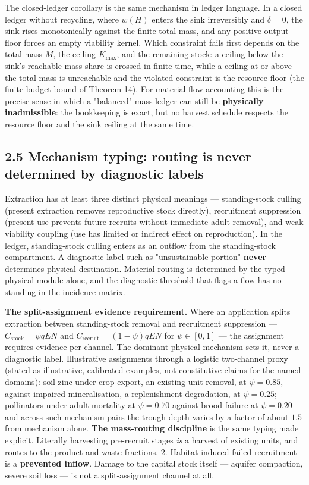 \documentclass[11pt]{article}
\begin{document}
The closed-ledger corollary is the same mechanism in ledger language. In a closed ledger without recycling, where \(w(H)\) enters the sink irreversibly and \(\delta = 0\), the sink rises monotonically against the finite total mass, and any positive output floor forces an empty viability kernel. Which constraint fails first depends on the total mass \(M\), the ceiling \(K_{\max}\), and the remaining stock: a ceiling below the sink's reachable mass share is crossed in finite time, while a ceiling at or above the total mass is unreachable and the violated constraint is the resource floor (the finite-budget bound of Theorem 14). For material-flow accounting this is the precise sense in which a "balanced" mass ledger can still be \textbf{physically inadmissible}: the bookkeeping is exact, but no harvest schedule respects the resource floor and the sink ceiling at the same time.

\subsection*{2.5 Mechanism typing: routing is never determined by diagnostic labels}\label{25-mechanism-typing-routing-is-never-determined-by-diagnostic-labels}

Extraction has at least three distinct physical meanings --- standing-stock culling (present extraction removes reproductive stock directly), recruitment suppression (present use prevents future recruits without immediate adult removal), and weak viability coupling (use has limited or indirect effect on reproduction). In the ledger, standing-stock culling enters as an outflow from the standing-stock compartment. A diagnostic label such as "unsustainable portion" \textbf{never} determines physical destination. Material routing is determined by the typed physical module alone, and the diagnostic threshold that flags a flow has no standing in the incidence matrix.

\textbf{The split-assignment evidence requirement.} Where an application splits extraction between standing-stock removal and recruitment suppression --- \(C_{\mathrm{stock}} = \psi qEN\) and \(C_{\mathrm{recruit}} =\allowbreak{} (1-\psi)qEN\) for \(\psi \in [0,1]\) --- the assignment requires evidence per channel. The dominant physical mechanism sets it, never a diagnostic label. Illustrative assignments through a logistic two-channel proxy (stated as illustrative, calibrated examples, not constitutive claims for the named domains): soil zinc under crop export, an existing-unit removal, at \(\psi = 0.85\), against impaired mineralisation, a replenishment degradation, at \(\psi = 0.25\); pollinators under adult mortality at \(\psi = 0.70\) against brood failure at \(\psi = 0.20\) --- and across such mechanism pairs the trough depth varies by a factor of about \(1.5\) from mechanism alone. \textbf{The mass-routing discipline} is the same typing made explicit. Literally harvesting pre-recruit stages \emph{is} a harvest of existing units, and routes to the product and waste fractions. 2. Habitat-induced failed recruitment is a \textbf{prevented inflow}. Damage to the capital stock itself --- aquifer compaction, severe soil loss --- is not a split-assignment channel at all.
\end{document}
